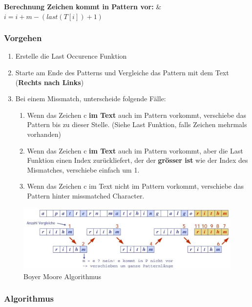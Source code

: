 \textbf{Berechnung Zeichen kommt in Pattern vor:} & $i=i+m-(last(T[i])+1)$

\clearpage

\subsubsection{Vorgehen}
\begin{enumerate}
	\item Erstelle die Last Occurence Funktion
	\item Starte am Ende des Patterns und Vergleiche das Pattern mit dem Text (\textbf{Rechts nach Links})
	\item Bei einem Missmatch, unterscheide folgende Fälle:
	\begin{enumerate}
		\item Wenn das Zeichen c \textbf{im Text} auch im Pattern vorkommt, verschiebe das Pattern bis zu dieser Stelle. (Siehe Last Funktion, falls Zeichen mehrmals vorhanden)
		\item Wenn das Zeichen c \textbf{im Text} auch im Pattern vorkommt, aber die Last Funktion einen Index zurückliefert, der der \textbf{grösser ist} wie der Index des Mismatches, verschiebe einfach um 1.
		\item Wenn das Zeichen c im Text nicht im Pattern vorkommt, verschiebe das Pattern hinter missmatched Character.
	\end{enumerate}
\end{enumerate}

\begin{figure}[h]
	\centering
	\includegraphics[width=0.9\linewidth]{images/boyer_moore_algorithm}
	\caption{Boyer Moore Algorithmus}
	\label{fig:boyermoorealgorithm}
\end{figure}
\clearpage
\subsubsection{Algorithmus}

